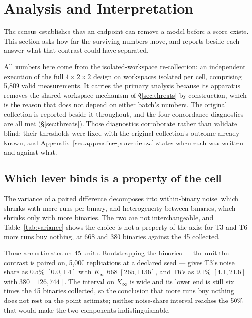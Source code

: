 \section{Analysis and Interpretation}
\label{sec:results}

The census establishes that an endpoint can remove a model before a score exists. This section asks how
far the surviving numbers move, and reports beside each answer what that contrast could have separated.

All numbers here come from the isolated-workspace re-collection: an independent execution of the full
$4\times2\times2$ design on workspaces isolated per cell, comprising 5{,}809 valid measurements. It carries
the primary analysis because its apparatus removes the shared-workspace mechanism of \S\ref{sec:threats}
by construction, which is the reason that does not depend on either batch's numbers. The original
collection is reported beside it throughout, and the four concordance diagnostics are all met
(\S\ref{sec:threats}). Those diagnostics corroborate rather than validate blind: their thresholds were
fixed with the original collection's outcome already known, and Appendix~\ref{sec:appendice-provenienza}
states when each was written and against what.

\subsection{Which lever binds is a property of the cell}
\label{sec:varianza}

The variance of a paired difference decomposes into within-binary noise, which shrinks with more runs per
binary, and heterogeneity between binaries, which shrinks only with more binaries. The two are not
interchangeable, and Table~\ref{tab:variance} shows the choice is not a property of the axis: for T3 and T6
more runs buy nothing, at 668 and 380 binaries against the 45 collected.



These are estimates on 45 units. Bootstrapping the binaries --- the unit the contrast is paired on, 5{,}000
replications at a declared seed --- gives T3's noise share as 0.5\% $[0.0, 1.4]$ with $K_\infty$ 668 $[265,
1136]$, and T6's as 9.1\% $[4.1, 21.6]$ with 380 $[126, 744]$. The interval on $K_\infty$ is wide and its
lower end is still six times the 45 binaries collected, so the conclusion that more runs buy nothing does
not rest on the point estimate; neither noise-share interval reaches the 50\% that would make the two
components indistinguishable.

